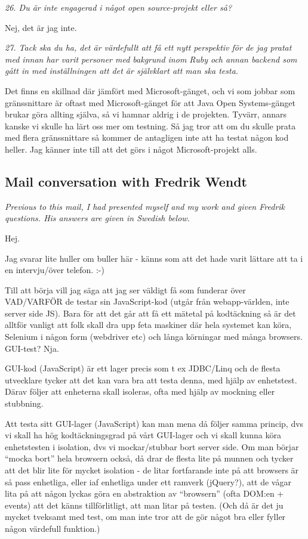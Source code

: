 \documentclass[11pt]{article}
\begin{document}
\emph{26. Du är inte engagerad i något open source-projekt eller så?}

Nej, det är jag inte.

\emph{27. Tack ska du ha, det är värdefullt att få ett nytt perspektiv för de jag pratat med innan har varit personer med bakgrund inom Ruby och annan backend som gått in med inställningen att det är självklart att man ska testa.}

Det finns en skillnad där jämfört med Microsoft-gänget, och vi som jobbar som gränssnittare är oftast med Microsoft-gänget för att Java Open Systems-gänget brukar göra allting själva, så vi hamnar aldrig i de projekten. Tyvärr, annars kanske vi skulle ha lärt oss mer om testning. Så jag tror att om du skulle prata med flera gränssnittare så kommer de antagligen inte att ha testat någon kod heller. Jag känner inte till att det görs i något Microsoft-projekt alls.

\subsection{Mail conversation with Fredrik Wendt}

\emph{Previous to this mail, I had presented myself and my work and given Fredrik questions. His answers are given in Swedish below.}

Hej.

Jag svarar lite huller om buller här - känns som att det hade varit
lättare att ta i en intervju/över telefon. :-)

Till att börja vill jag säga att jag ser väldigt få som funderar över
VAD/VARFÖR de testar sin JavaScript-kod (utgår från webapp-världen, inte
server side JS). Bara för att det går att få ett mätetal på %
kodtäckning så är det alltför vanligt att folk skall dra upp feta
maskiner där hela systemet kan köra, Selenium i någon form (webdriver
etc) och långa körningar med många browsers. GUI-test? Nja.

GUI-kod (JavaScript) är ett lager precis som t ex JDBC/Linq och de
flesta utvecklare tycker att det kan vara bra att testa denna, med hjälp
av enhetstest. Därav följer att enheterna skall isoleras, ofta med hjälp
av mockning eller stubbning.

Att testa sitt GUI-lager (JavaScript) kan man mena då följer samma
princip, dvs vi skall ha hög kodtäckningsgrad på vårt GUI-lager och vi
skall kunna köra enhetstesten i isolation, dvs vi mockar/stubbar bort
server side. Om man börjar ``mocka bort'' hela browsern också, då drar de
flesta lite på munnen och tycker att det blir lite för mycket isolation
- de litar fortfarande inte på att browsers är så pass enhetliga, eller
iaf enhetliga under ett ramverk (jQuery?), att de vågar lita på att
någon lyckas göra en abstraktion av ``browsern'' (ofta DOM:en + events)
att det känns tillförlitligt, att man litar på testen. (Och då är det ju
mycket tveksamt med test, om man inte tror att de gör något bra eller
fyller någon värdefull funktion.)
\end{document}
